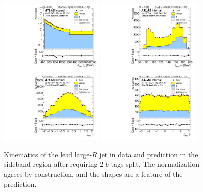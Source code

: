 \clearpage

\begin{figure}[htbp!]
\begin{center}
\includegraphics[width=0.45\textwidth,angle=-90]{figures/boosted/Sideband/b77_TwoTag_split_Sideband_leadHCand_Pt_m_1.pdf}
\includegraphics[width=0.45\textwidth,angle=-90]{figures/boosted/Sideband/b77_TwoTag_split_Sideband_leadHCand_Mass_s.pdf}\\
\includegraphics[width=0.45\textwidth,angle=-90]{figures/boosted/Sideband/b77_TwoTag_split_Sideband_leadHCand_Eta.pdf}
\includegraphics[width=0.45\textwidth,angle=-90]{figures/boosted/Sideband/b77_TwoTag_split_Sideband_leadHCand_Phi.pdf}
  \caption{Kinematics of the lead large-$R$ jet in data and prediction in the sideband region after requiring 2 $b$-tags split. The normalization agrees by construction, and the shapes are a feature of the prediction.}
  \label{fig:boosted-2bs-sideband-ak10-lead}
\end{center}
\end{figure}

